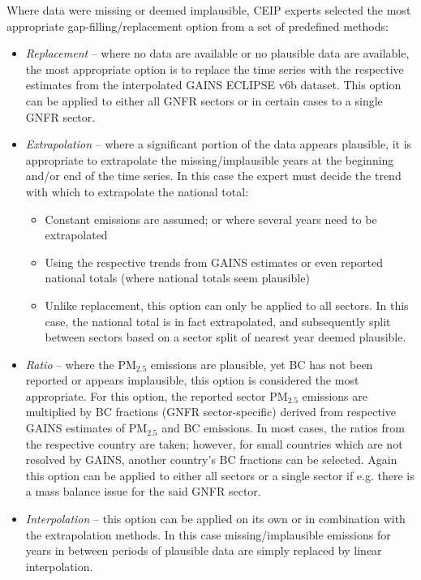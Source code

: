 Where data were missing or deemed implausible, CEIP experts selected the most appropriate gap-filling/replacement option from a set of predefined methods:

\begin{itemize}
    \item {\it Replacement} -- where no data are available or no plausible data are available, the most appropriate option is to replace the time series with the respective estimates from the interpolated GAINS ECLIPSE v6b dataset. This option can be applied to either all GNFR sectors or in certain cases to a single GNFR sector. 
\item {\it Extrapolation}  -- where a significant portion of the data appears plausible, it is appropriate to extrapolate the missing/implausible years at the beginning and/or end of the time series. In this case the expert must decide the trend with which to extrapolate the national total:
\begin{itemize}
\item Constant emissions are assumed; or where several years need to be extrapolated
\item Using the respective trends from GAINS estimates or even reported national totals (where national totals seem plausible) 
\item Unlike replacement, this option can only be applied to all sectors. In this case, the national total is in fact extrapolated, and subsequently split between sectors based on a sector split of nearest year deemed plausible.
\end{itemize}
\item {\it Ratio} -- where the PM$_{2.5}$ emissions are plausible, yet BC has not been reported or appears implausible, this option is considered the most appropriate. For this option, the reported sector PM$_{2.5}$ emissions are multiplied by BC fractions (GNFR sector-specific) derived from respective GAINS estimates of PM$_{2.5}$ and BC emissions. In most cases, the ratios from the respective country are taken; however, for small countries which are not resolved by GAINS, another country’s BC fractions can be selected. Again this option can be applied to either all sectors or a single sector if e.g. there is a mass balance issue for the said GNFR sector.
\item {\it Interpolation} -- this option can be applied on its own or in combination with the extrapolation methods. In this case missing/implausible emissions for years in between periods of plausible data are simply replaced by linear interpolation.
\end{itemize}

